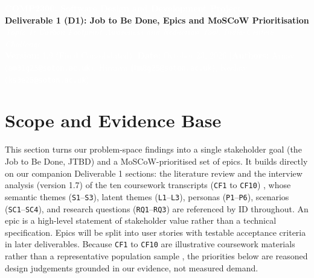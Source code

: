 \documentclass[12pt, a4paper]{article}
\begin{document}
\begin{tcolorbox}[enhanced, colback=cNavy, colframe=cNavy, arc=3pt, left=8pt, right=8pt, top=7pt, bottom=7pt]
\begin{center}
    {\Large\bfseries\textcolor{white}{COMP2300: Software Design and Development Project}}\\[0.2em]
    {\large\bfseries\textcolor{bgSand}{Deliverable 1 (D1): Job to Be Done, Epics and MoSCoW Prioritisation}}\\[0.15em]
    {\small\itshape\textcolor{white}{Topic 1: Carbon Footprint Awareness and Reduction Tool: India-Centric Challenge}}\\[0.35em]
    {\footnotesize\textcolor{white}{\textbf{Version:} 1.9 (Final Consolidated) \quad|\quad \textbf{Date:} October 23, 2026 \quad|\quad \textbf{Authors:} Arnav (\texttt{am31g25@soton.ac.uk}), Hiranya (\texttt{hm8g25@soton.ac.uk}), Keshav (\texttt{ks3e25@soton.ac.uk})}}
\end{center}
\end{tcolorbox}

\section{Scope and Evidence Base}
This section turns our problem-space findings into a single stakeholder goal (the Job to Be Done, JTBD) and a MoSCoW-prioritised set of epics. It builds directly on our companion Deliverable 1 sections: the literature review \cite{lee2021,gandhi2025,grinstein2018,shi2021,mulrow2019,collins2020,hoffmann2024,lasarov2024,froehlich2010,mohanty2023,brynjarsdottir2012,froehlich2012,tiefenbeck2019} and the interview analysis (version 1.7) of the ten coursework transcripts (\texttt{CF1} to \texttt{CF10}) \cite{cf1,cf2,cf3,cf4,cf5,cf6,cf7,cf8,cf9,cf10}, whose semantic themes (\texttt{S1}--\texttt{S3}), latent themes (\texttt{L1}--\texttt{L3}), personas (\texttt{P1}--\texttt{P6}), scenarios (\texttt{SC1}--\texttt{SC4}), and research questions (\texttt{RQ1}--\texttt{RQ3}) are referenced by ID throughout. An epic is a high-level statement of stakeholder value rather than a technical specification. Epics will be split into user stories with testable acceptance criteria in later deliverables. Because \texttt{CF1} to \texttt{CF10} are illustrative coursework materials rather than a representative population sample \cite{cf1,cf10}, the priorities below are reasoned design judgements grounded in our evidence, not measured demand.
\end{document}
